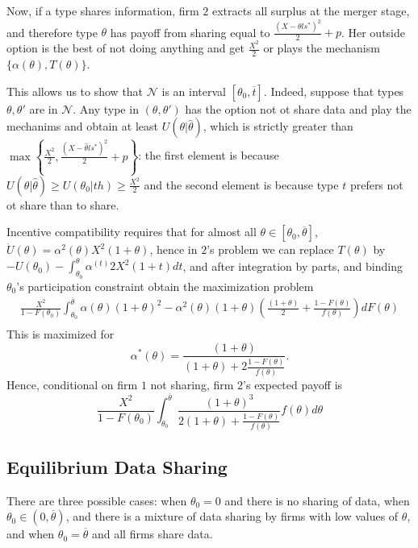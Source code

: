 \documentclass[a4paper]{article}
\newcommand{\N}{\mathcal N}
\renewcommand{\th}{\hat\theta}
\renewcommand{\t}{\theta}
\renewcommand{\a}{\alpha}
\begin{document}
Now, if a type shares information, firm $2$ extracts all surplus at the merger stage, and therefore type $\t$ has payoff from sharing equal to $\frac{(X-\t ls^*)^2}{2}+p$. Her outside option is the best of not doing anything and get $\frac{X^2}{2}$ or plays the mechanism $\{\a(\t),T(\t)\}$. 

This allows us to show that $\N$ is an interval $[\t_0,\overline t]$. Indeed, suppose that types $\t,\t'$ are in $\N$. Any type in $(\t,\t')$ has the option not ot share data and play the mechanims and obtain at least $U(\t|\th)$, which is strictly greater than $\max\left\{\frac{X^2}{2}, \frac{(X-\th ls^*)^2}{2}+p\right\}$: the first element is because $U(\t|\th)\geq U(\t_0|th)\geq \frac{X^2}{2}$ and the second element is because type $t$ prefers not ot share than to share. 

Incentive compatibility requires that for almost all $\t\in[\t_0,\overline \t]$, $\dot U(\t)=\a^2(\t) X^2(1+\t)$, hence in $2$'s problem we can replace $T(\t)$ by $-U(\t_0)-\int_{\t_0}^\t \a^(t)2 X^2(1+t)dt$, and after integration by parts, and binding $\t_0$'s participation constraint obtain the maximization problem
%
\begin{equation}
\begin{aligned}
    \frac{X^2}{1-F(\t_0)}\int_{\t_0}^{\overline \t}\a(\t) (1+\t)^2-\a^2(\t)(1+\t)\left(\frac{(1+\t)}{2}+\frac{1-F(\t)}{f(\t)}\right) dF(\t)\\
\end{aligned}
\end{equation}
This is maximized for 
%
\begin{equation}
    \a^*(\t)=\frac{(1+\t)}{(1+\t)+2 \frac{1-F(\t)}{f(\t)}}.
\end{equation}
%
Hence, conditional on firm $1$ not sharing, firm $2$'s expected payoff is 
%
\[
   \frac{X^2}{1-F(\t_0)}\int_{\t_0}^{\overline \t} \frac{(1+\t)^3}{2(1+\t)+\frac{1-F(\t)}{f(\t)}}f(\t)d\t
\]
%



\subsection*{Equilibrium Data Sharing}
There are three possible cases: when $\t_0=0$ and there is no sharing of data, when $\t_0\in(0,\overline \t)$, and there is a mixture of data sharing by firms with low values of $\t$, and when $\t_0=\overline \t$ and all firms share data.
\end{document}
